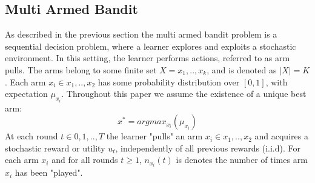 \documentclass{llncs}
\begin{document}
	\subsection{Multi Armed Bandit}
	As described in the previous section the multi armed bandit problem is a sequential decision problem, where a learner explores and exploits a stochastic environment. 
	In this setting, the learner performs actions, referred to as arm pulls. The arms belong to some finite set $X = {x_1,..,x_k}$, and is denoted as  $|X| = K $. 
	Each arm $x_i \in {x_1,..,x_2}$ has some probability distribution over $[0, 1]$, with expectation $\mu_{x_i}$. 
	Throughout this paper we assume the existence of a unique best arm:
	$$ x^* = argmax_{x_i}(\mu_{x_i})$$
	At each round $t \in 0,1,..,T$ the learner "pulls" an arm $x_i \in {x_1,..,x_2}$ and acquires a stochastic reward or utility $u_t$, independently of all previous rewards (i.i.d). 
	For each arm $x_i$ and for all rounds $t \geq 1$,  $n_{x_i}(t)$ is denotes the number of times arm $x_i$ has been "played".
	
\end{document}
